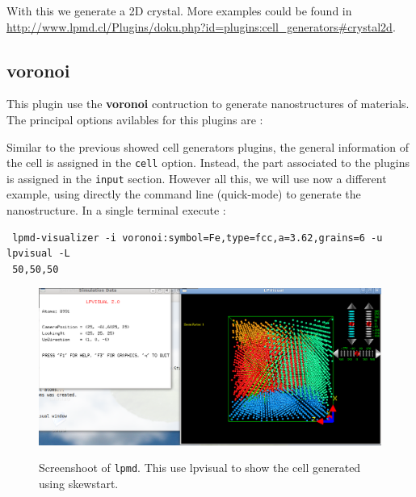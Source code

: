 With this we generate a 2D crystal. More examples could be found in
\url{http://www.lpmd.cl/Plugins/doku.php?id=plugins:cell_generators#crystal2d}.

\subsection{voronoi}
This plugin use the \textbf{voronoi} contruction to generate nanostructures of
materials. The principal options avilables for this plugins are :


Similar to the previous showed cell generators plugins, the general information
of the cell is assigned in the \verb|cell| option. Instead, the part associated
to the plugins is assigned in the \verb|input| section. However all this, we
will use now a different example, using directly the command line (quick-mode)
to generate the nanostructure. In a single terminal execute :

\begin{verbatim}
 lpmd-visualizer -i voronoi:symbol=Fe,type=fcc,a=3.62,grains=6 -u lpvisual -L 
 50,50,50
\end{verbatim}

\begin{figure}[h!]
 \centering
 \includegraphics[scale=.35]{voronoi-1.png}
 \label{fig:voronoi-1}
 \caption{Screenshoot of \texttt{lpmd}. This use lpvisual to show the cell
generated using skewstart.}
\end{figure}


